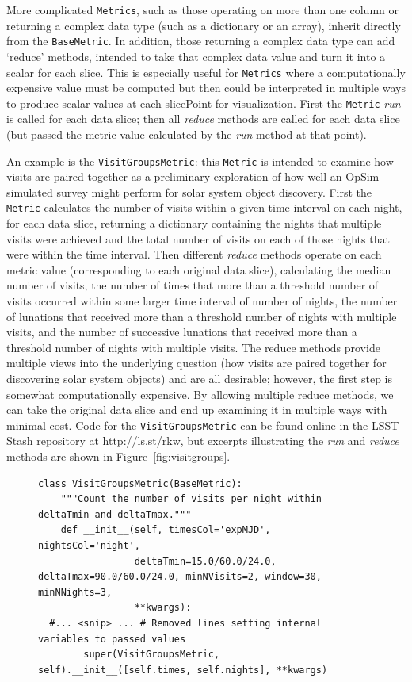 \documentclass[]{spie}  %
\begin{document}
{More complicated {\tt Metrics}, such as those operating on more than one
column or returning a complex data type (such as a dictionary or an
array), inherit directly from the {\tt BaseMetric}. In addition, those
returning a complex data type can add `reduce' methods, intended to
take that complex data value and turn it into a scalar for each
slice. This is especially useful for {\tt Metrics} where a computationally
expensive value must be computed but then could be interpreted in
multiple ways to produce scalar values at each slicePoint for
visualization.  First the {\tt Metric} {\it run} is called for each data
slice; then all {\it reduce} methods are called for each data slice
(but passed the metric value calculated by the {\it run} method at
that point).

An example is the {\tt VisitGroupsMetric}:
this {\tt Metric} is intended to examine how visits are paired together as a
preliminary exploration of how well an OpSim simulated survey might perform for solar
system object discovery. First the {\tt Metric} calculates the number of visits
within a given time interval on each night, for each data slice,
returning a dictionary containing the nights that multiple visits were
achieved and the total number of visits on each of those nights that
were within the time interval. Then different {\it reduce} methods
operate on each metric value (corresponding to each original data slice),
calculating the median number of visits, the number of times that more
than a threshold number of visits occurred within some larger time
interval of number of nights, the number of lunations that received
more than a threshold number of nights with multiple visits, and
the number of successive lunations that received more than a
threshold number of nights with multiple visits. The reduce methods
provide multiple views into the underlying question (how visits are
paired together for discovering solar system objects) and are all
desirable; however, the first step is somewhat computationally
expensive. By allowing multiple reduce methods, we can take the
original data slice and end up examining it in multiple ways with
minimal cost. Code for the {\tt VisitGroupsMetric} can be found online in
the LSST Stash repository at {\url {http://ls.st/rkw}},
but excerpts illustrating the {\it run} and {\it reduce}
methods are shown in Figure~\ref{fig:visitgroups}. 

\begin{figure}
\begin{lstlisting}[frame=single]
class VisitGroupsMetric(BaseMetric):
    """Count the number of visits per night within deltaTmin and deltaTmax."""
    def __init__(self, timesCol='expMJD', nightsCol='night', 
                 deltaTmin=15.0/60.0/24.0, deltaTmax=90.0/60.0/24.0, minNVisits=2, window=30, minNNights=3,
                 **kwargs):
  #... <snip> ... # Removed lines setting internal variables to passed values
        super(VisitGroupsMetric, self).__init__([self.times, self.nights], **kwargs)


\end{lstlisting}
\end{figure}}
\end{document}
